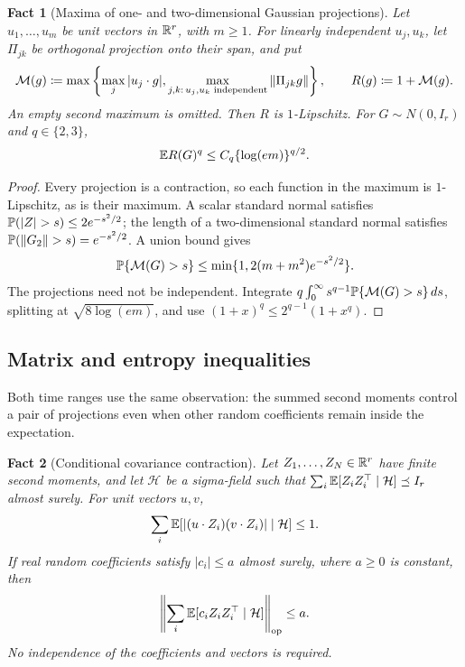 \documentclass[11pt,letterpaper]{article}
\theoremstyle{plain}
\newtheorem{fact}{Fact}[section]
\begin{document}
\begin{fact}[Maxima of one- and two-dimensional Gaussian projections]
\label{tb:projection-moments}
Let \(u_1,\ldots,u_m\) be unit vectors in \(\mathbb R^r\), with \(m\ge1\).
For linearly independent \(u_j,u_k\), let \(\Pi_{jk}\) be orthogonal
projection onto their span, and put
\[
 \mathcal M(g)\coloneqq \max\left\{\max_j|u_j\cdot g|,
   \max_{j,k:\,u_j,u_k\text{ independent}}\left\lVert\Pi_{jk}g\right\rVert\right\},
 \qquad R(g)\coloneqq 1+\mathcal M(g).
\]
An empty second maximum is omitted. Then \(R\) is \(1\)-Lipschitz.
For \(G\sim N(0,I_r)\) and \(q\in\{2,3\}\),
\[
 \mathbb E R(G)^q\le C_q\{\log(em)\}^{q/2}.
\]
\end{fact}

\begin{proof}
Every projection is a contraction, so each function in the maximum
is \(1\)-Lipschitz, as is their maximum. A scalar standard normal
satisfies \(\Pp(|Z|>s)\le2e^{-s^2/2}\); the length of a
two-dimensional standard normal satisfies
\(\mathbb P(\left\lVert G_2\right\rVert>s)=e^{-s^2/2}\). A union bound gives
\[
 \mathbb P\{\mathcal M(G)>s\}\le\min\{1,2(m+m^2)e^{-s^2/2}\}.
\]
The projections need not be independent. Integrate
\(q\int_0^\infty s^{q-1}\mathbb P\{\mathcal M(G)>s\}\,ds\), splitting
at \(\sqrt{8\log(em)}\), and use
\((1+x)^q\le2^{q-1}(1+x^q)\).
\end{proof}


\subsection{Matrix and entropy inequalities}\label{tb:sec:matrix}

Both time ranges use the same observation: the summed second moments
control a pair of projections even when other random coefficients
remain inside the expectation.

\begin{fact}[Conditional covariance contraction]\label{tb:covariance}
Let \(Z_1,\ldots,Z_N\in\mathbb R^r\) have finite second moments, and let
\(\mathcal H\) be a sigma-field such that
\(\sum_i\mathbb E[Z_iZ_i^\top\mid\mathcal H]\preceq I_r\) almost surely.
For unit vectors \(u,v\),
\[
 \sum_i\mathbb E[|(u\cdot Z_i)(v\cdot Z_i)|\mid\mathcal H]\le1.
\]
If real random coefficients satisfy \(|c_i|\le a\) almost surely,
where \(a\ge0\) is constant, then
\[
 \left\|\sum_i\mathbb E[c_iZ_iZ_i^\top\mid\mathcal H]\right\|_{\mathrm{op}}\le a.
\]
No independence of the coefficients and vectors is required.
\end{fact}
\end{document}
